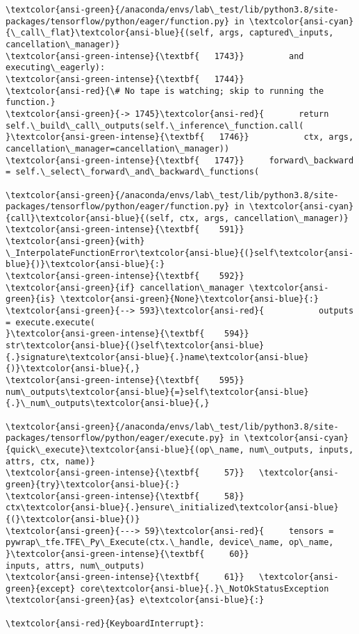 \documentclass[11pt]{article}
\begin{document}
\begin{Verbatim}[commandchars=\\\{\}, frame=single, framerule=2mm, rulecolor=\color{outerrorbackground}]
\textcolor{ansi-green}{/anaconda/envs/lab\_test/lib/python3.8/site-packages/tensorflow/python/eager/function.py} in \textcolor{ansi-cyan}{\_call\_flat}\textcolor{ansi-blue}{(self, args, captured\_inputs, cancellation\_manager)}
\textcolor{ansi-green-intense}{\textbf{   1743}}         and executing\_eagerly):
\textcolor{ansi-green-intense}{\textbf{   1744}}       \textcolor{ansi-red}{\# No tape is watching; skip to running the function.}
\textcolor{ansi-green}{-> 1745}\textcolor{ansi-red}{       return self.\_build\_call\_outputs(self.\_inference\_function.call(
}\textcolor{ansi-green-intense}{\textbf{   1746}}           ctx, args, cancellation\_manager=cancellation\_manager))
\textcolor{ansi-green-intense}{\textbf{   1747}}     forward\_backward = self.\_select\_forward\_and\_backward\_functions(

\textcolor{ansi-green}{/anaconda/envs/lab\_test/lib/python3.8/site-packages/tensorflow/python/eager/function.py} in \textcolor{ansi-cyan}{call}\textcolor{ansi-blue}{(self, ctx, args, cancellation\_manager)}
\textcolor{ansi-green-intense}{\textbf{    591}}       \textcolor{ansi-green}{with} \_InterpolateFunctionError\textcolor{ansi-blue}{(}self\textcolor{ansi-blue}{)}\textcolor{ansi-blue}{:}
\textcolor{ansi-green-intense}{\textbf{    592}}         \textcolor{ansi-green}{if} cancellation\_manager \textcolor{ansi-green}{is} \textcolor{ansi-green}{None}\textcolor{ansi-blue}{:}
\textcolor{ansi-green}{--> 593}\textcolor{ansi-red}{           outputs = execute.execute(
}\textcolor{ansi-green-intense}{\textbf{    594}}               str\textcolor{ansi-blue}{(}self\textcolor{ansi-blue}{.}signature\textcolor{ansi-blue}{.}name\textcolor{ansi-blue}{)}\textcolor{ansi-blue}{,}
\textcolor{ansi-green-intense}{\textbf{    595}}               num\_outputs\textcolor{ansi-blue}{=}self\textcolor{ansi-blue}{.}\_num\_outputs\textcolor{ansi-blue}{,}

\textcolor{ansi-green}{/anaconda/envs/lab\_test/lib/python3.8/site-packages/tensorflow/python/eager/execute.py} in \textcolor{ansi-cyan}{quick\_execute}\textcolor{ansi-blue}{(op\_name, num\_outputs, inputs, attrs, ctx, name)}
\textcolor{ansi-green-intense}{\textbf{     57}}   \textcolor{ansi-green}{try}\textcolor{ansi-blue}{:}
\textcolor{ansi-green-intense}{\textbf{     58}}     ctx\textcolor{ansi-blue}{.}ensure\_initialized\textcolor{ansi-blue}{(}\textcolor{ansi-blue}{)}
\textcolor{ansi-green}{---> 59}\textcolor{ansi-red}{     tensors = pywrap\_tfe.TFE\_Py\_Execute(ctx.\_handle, device\_name, op\_name,
}\textcolor{ansi-green-intense}{\textbf{     60}}                                         inputs, attrs, num\_outputs)
\textcolor{ansi-green-intense}{\textbf{     61}}   \textcolor{ansi-green}{except} core\textcolor{ansi-blue}{.}\_NotOkStatusException \textcolor{ansi-green}{as} e\textcolor{ansi-blue}{:}

\textcolor{ansi-red}{KeyboardInterrupt}: 
    \end{Verbatim}
\end{document}

